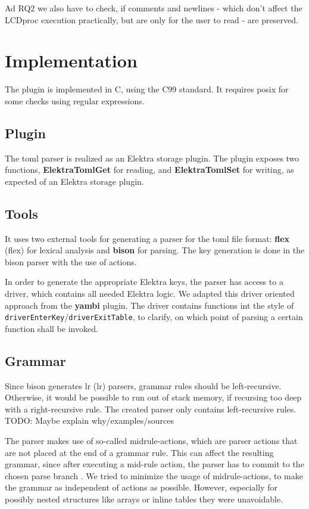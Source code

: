 \documentclass[draft,final]{vutinfth} %
\begin{document}
Ad RQ2 we also have to check, if comments and newlines - which don't affect the LCDproc execution practically, but are only for the user to read - are preserved.

\chapter{Implementation}

The plugin is implemented in C, using the C99 standard. It requires \acrshort{posix} for some checks using regular expressions.

\section{Plugin}
The \acrshort{toml} parser is realized as an Elektra storage plugin. The plugin exposes two functions, \textbf{ElektraTomlGet} for reading, and \textbf{ElektraTomlSet} for writing, as expected of an Elektra storage plugin.

\section{Tools}
It uses two external tools for generating a parser for the toml file format: \textbf{\acrshort{flex}} (\acrlong{flex}) \cite{flexgit} for lexical analysis and \textbf{bison} \cite{bisonmain} for parsing.
The key generation is done in the bison parser with the use of actions.

In order to generate the appropriate Elektra keys, the parser has access to a driver, which contains all needed Elektra logic.
We adapted this driver oriented approach from the \textbf{yambi}\cite{Elektrayambi} plugin.
The driver contains functions int the style of \\ \texttt{driverEnterKey}/\texttt{driverExitTable}, to clarify, on which point of parsing a certain function shall be invoked.

\section{Grammar}
Since bison generates \acrshort{lr} (\acrlong{lr}) parsers, grammar rules should be left-recursive.
Otherwise, it would be possible to run out of stack memory, if recursing too deep with a right-recursive rule.
The created parser only contains left-recursive rules.
TODO: Maybe explain why/examples/sources

The parser makes use of so-called midrule-actions, which are parser actions that are not placed at the end of a grammar rule.
This can affect the resulting grammar, since after executing a mid-rule action, the parser has to commit to the chosen parse branch \cite{bisonmidruleconflicts}.
We tried to minimize the usage of midrule-actions, to make the grammar as independent of actions as possible.
However, especially for possibly nested structures like arrays or inline tables they were unavoidable.
\end{document}
